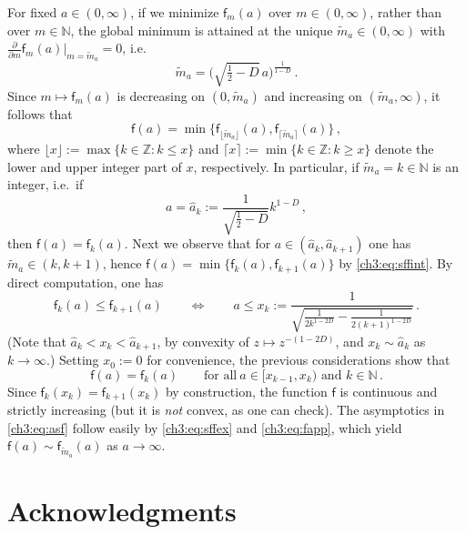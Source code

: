 \documentclass[a4paper,reqno,11pt]{amsart}
\numberwithin{equation}{section}
\renewcommand{\tilde}{\widetilde}          %
\newcommand{\Z}{\mathbb{Z}}
\newcommand{\N}{\mathbb{N}}
\newcommand\sff{\mathsf{f}}
\begin{document}
For fixed $a \in (0,\infty)$, if we minimize $\sff_m(a)$ over
$m\in (0,\infty)$, rather than over $m\in\N$, the global minimum is
attained at the unique $\tilde m_a \in (0,\infty)$ with
$\frac{\partial}{\partial m} \sff_m(a) |_{m=\tilde m_a} = 0$, i.e.
\begin{equation*}
	\tilde m_a = \bigg( \sqrt{\tfrac{1}{2}-D} \, 
	 a \bigg)^{\frac{1}{1-D}} \,.
\end{equation*}
Since $m \mapsto \sff_m(a)$ is decreasing on $(0,\tilde m_a)$
and increasing on $(\tilde m_a, \infty)$, it follows that
\begin{equation} \label{ch3:eq:sffint}
	\sff(a) = \min \big\{ \sff_{\lfloor \tilde m_a \rfloor}(a),
	\sff_{\lceil \tilde m_a \rceil}(a) \big\} \,,
\end{equation}
where $\lfloor x \rfloor := \max\{k \in \Z: k \le x\}$ and 
$\lceil x \rceil := \min\{k \in \Z: k \ge x\}$ denote the lower and
upper integer part of $x$, respectively.
In particular, if $\tilde m_a = k \in \N$ is an integer, i.e.\ if
\begin{equation*}
	a = \hat a_k := \frac{ 1}{\sqrt{\frac{1}{2}-D}} k^{1-D} \,,
\end{equation*}
then $\sff(a) = \sff_k(a)$. Next we observe that for $a \in (\hat a_k, \hat a_{k+1})$ one has
$\tilde m_a \in (k, k+1)$, hence $\sff(a) = \min\{\sff_k(a), \sff_{k+1}(a)\}$ by \eqref{ch3:eq:sffint}.
By direct computation, one has
\begin{equation*}
	\sff_k(a) \le \sff_{k+1}(a) \qquad \iff \qquad
	a \le x_k := \frac{ 1}{\sqrt{\frac{1}{2k^{1-2D}}
	- \frac{1}{2(k+1)^{1-2D}}}}  \,.
\end{equation*}
(Note that $\hat a_k < x_k < \hat a_{k+1}$, by
convexity of $z \mapsto z^{-(1-2D)}$, and
$x_k \sim \hat a_k$ as $k \to \infty$.)
Setting $x_0 := 0$ for convenience,
the previous considerations show that
\begin{equation} \label{ch3:eq:sffex}
	\sff(a) = \sff_k(a) \qquad \text{for all} \ a \in [x_{k-1}, x_k)
	\text{ and } k\in\N \,.
\end{equation}
Since $\sff_k(x_k) = \sff_{k+1}(x_k)$ by construction, the function $\sff$ 
is continuous and strictly increasing (but it is \emph{not} convex, as one can check).
The asymptotics in \eqref{ch3:eq:asf} follow easily by \eqref{ch3:eq:sffex}
and \eqref{ch3:eq:fapp}, which yield $\sff(a) \sim \sff_{\tilde m_a}(a)$ as $a \to \infty$.

\section*{Acknowledgments}
\end{document}

